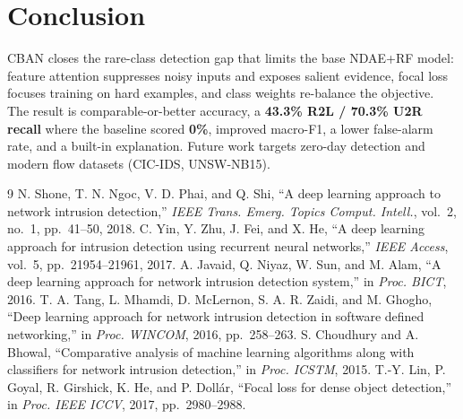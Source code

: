 \documentclass[conference]{IEEEtran}
\begin{document}
\section{Conclusion}
CBAN closes the rare-class detection gap that limits the base NDAE+RF model:
feature attention suppresses noisy inputs and exposes salient evidence, focal
loss focuses training on hard examples, and class weights re-balance the
objective. The result is comparable-or-better accuracy, a
\textbf{43.3\% R2L / 70.3\% U2R recall} where the baseline scored \textbf{0\%},
improved macro-F1, a lower false-alarm rate, and a built-in explanation.
Future work targets zero-day detection and modern flow datasets (CIC-IDS,
UNSW-NB15).

\begin{thebibliography}{9}
 N. Shone, T. N. Ngoc, V. D. Phai, and Q. Shi,
``A deep learning approach to network intrusion detection,''
\textit{IEEE Trans. Emerg. Topics Comput. Intell.}, vol.~2, no.~1, pp.~41--50, 2018.
 C. Yin, Y. Zhu, J. Fei, and X. He, ``A deep learning approach for intrusion
detection using recurrent neural networks,'' \textit{IEEE Access}, vol.~5, pp.~21954--21961, 2017.
 A. Javaid, Q. Niyaz, W. Sun, and M. Alam, ``A deep learning approach for
network intrusion detection system,'' in \textit{Proc. BICT}, 2016.
 T. A. Tang, L. Mhamdi, D. McLernon, S. A. R. Zaidi, and M. Ghogho,
``Deep learning approach for network intrusion detection in software defined networking,''
in \textit{Proc. WINCOM}, 2016, pp.~258--263.
 S. Choudhury and A. Bhowal, ``Comparative analysis of machine learning
algorithms along with classifiers for network intrusion detection,'' in \textit{Proc. ICSTM}, 2015.
 T.-Y. Lin, P. Goyal, R. Girshick, K. He, and P. Doll\'ar, ``Focal loss for dense
object detection,'' in \textit{Proc. IEEE ICCV}, 2017, pp.~2980--2988.
\end{thebibliography}
\end{document}
